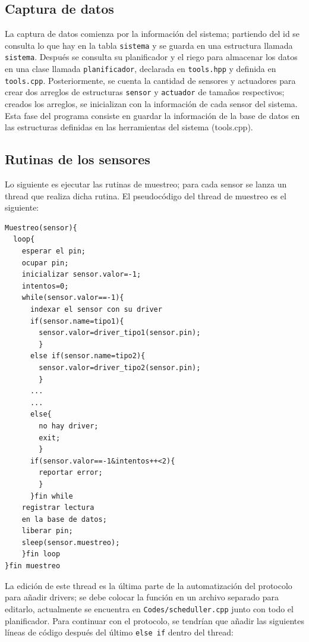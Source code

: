\documentclass[a4paper,10pt,titlepage]{article}
\begin{document}
\subsection{Captura de datos}
La captura de datos comienza por la informaci\'on del sistema; partiendo del id se consulta lo que hay en la tabla \verb|sistema| y se guarda en una estructura 
llamada \verb|sistema|. Despu\'es se 
consulta su planificador y el riego para almacenar los datos en una clase llamada 
\verb|planificador|, declarada en \verb|tools.hpp| y definida en \verb|tools.cpp|. Posteriormente, se cuenta la cantidad de sensores y actuadores para crear dos arreglos de 
estructuras \verb|sensor| y \verb|actuador| de tama\~nos respectivos; creados los arreglos, se inicializan con la informaci\'on de cada sensor del sistema. Esta fase del 
programa consiste en guardar la informaci\'on de la base de datos en las estructuras definidas en las herramientas del sistema (tools.cpp). 
 
\subsection{Rutinas de los sensores}
Lo siguiente es ejecutar las rutinas de muestreo; para cada sensor se lanza un thread que realiza dicha rutina. El pseudoc\'odigo del thread de muestreo es el siguiente:

\begin{verbatim}
Muestreo(sensor){
  loop{
    esperar el pin;
    ocupar pin;
    inicializar sensor.valor=-1;
    intentos=0;
    while(sensor.valor==-1){
      indexar el sensor con su driver
      if(sensor.name=tipo1){
        sensor.valor=driver_tipo1(sensor.pin);
        }
      else if(sensor.name=tipo2){
        sensor.valor=driver_tipo2(sensor.pin);
        } 
      ...
      ...
      else{
        no hay driver;
        exit;
        }
      if(sensor.valor==-1&intentos++<2){
        reportar error;
        }
      }fin while
    registrar lectura
    en la base de datos;
    liberar pin;
    sleep(sensor.muestreo);
    }fin loop
}fin muestreo
\end{verbatim}

La edici\'on de este thread es la 
\'ultima parte 
de la automatizaci\'on del protocolo para a\~nadir drivers; se debe colocar la funci\'on en un archivo separado para editarlo, actualmente se encuentra en 
\verb|Codes/scheduller.cpp| junto con todo el planificador. Para continuar con el protocolo, se tendr\'ian que a\~nadir las siguientes l\'ineas de c\'odigo despu\'es 
del \'ultimo \verb|else if| dentro del thread:
\end{document}
